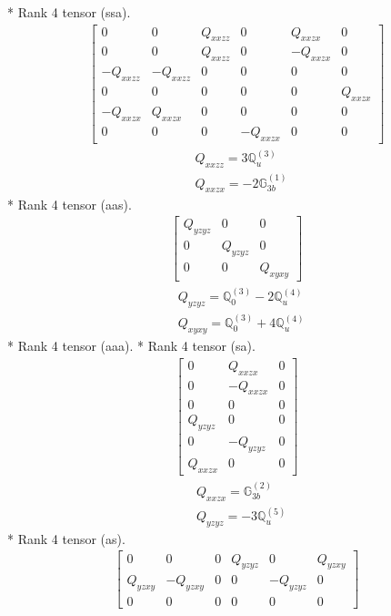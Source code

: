 \documentclass[fleqn,8pt,landscape]{jsarticle}
\begin{document}
* Rank 4 tensor (ssa).
\begin{align*}
\begin{bmatrix} 0 & 0 & Q_{xxzz} & 0 & Q_{xxzx} & 0 \\ 0 & 0 & Q_{xxzz} & 0 & - Q_{xxzx} & 0 \\ - Q_{xxzz} & - Q_{xxzz} & 0 & 0 & 0 & 0 \\ 0 & 0 & 0 & 0 & 0 & Q_{xxzx} \\ - Q_{xxzx} & Q_{xxzx} & 0 & 0 & 0 & 0 \\ 0 & 0 & 0 & - Q_{xxzx} & 0 & 0 \end{bmatrix}
\end{align*}
\begin{align*}
& Q_{xxzz} = 3 \mathbb{Q}_{u}^{(3)} \\
& Q_{xxzx} = - 2 \mathbb{G}_{3b}^{(1)}
\end{align*}
* Rank 4 tensor (aas).
\begin{align*}
\begin{bmatrix} Q_{yzyz} & 0 & 0 \\ 0 & Q_{yzyz} & 0 \\ 0 & 0 & Q_{xyxy} \end{bmatrix}
\end{align*}
\begin{align*}
& Q_{yzyz} = \mathbb{Q}_{0}^{(3)} - 2 \mathbb{Q}_{u}^{(4)} \\
& Q_{xyxy} = \mathbb{Q}_{0}^{(3)} + 4 \mathbb{Q}_{u}^{(4)}
\end{align*}
* Rank 4 tensor (aaa).
* Rank 4 tensor (sa).
\begin{align*}
\begin{bmatrix} 0 & Q_{xxzx} & 0 \\ 0 & - Q_{xxzx} & 0 \\ 0 & 0 & 0 \\ Q_{yzyz} & 0 & 0 \\ 0 & - Q_{yzyz} & 0 \\ Q_{xxzx} & 0 & 0 \end{bmatrix}
\end{align*}
\begin{align*}
& Q_{xxzx} = \mathbb{G}_{3b}^{(2)} \\
& Q_{yzyz} = - 3 \mathbb{Q}_{u}^{(5)}
\end{align*}
* Rank 4 tensor (as).
\begin{align*}
\begin{bmatrix} 0 & 0 & 0 & Q_{yzyz} & 0 & Q_{yzxy} \\ Q_{yzxy} & - Q_{yzxy} & 0 & 0 & - Q_{yzyz} & 0 \\ 0 & 0 & 0 & 0 & 0 & 0 \end{bmatrix}
\end{align*}
\end{document}

